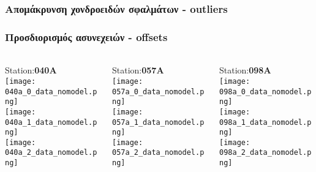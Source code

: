 \begin{frame}
  \frametitle{Απομάκρυνση χονδροειδών σφαλμάτων - outliers}
  \framesubtitle{}
  \label{}
  
\end{frame}
\note{}

\begin{frame}
  \frametitle{Προσδιορισμός ασυνεχειών - offsets}
  \framesubtitle{}
  \label{}
  \vskip-1cm
  \begin{columns}[T]
    \begin{column}{.33\textwidth}
      \begin{center}
      Station:\textbf{040A}\\
         \texttt{[image: 040a\_0\_data\_nomodel.png]}\\
         \texttt{[image: 040a\_1\_data\_nomodel.png]}\\
         \texttt{[image: 040a\_2\_data\_nomodel.png]}
       \end{center} 
    \end{column}
    \begin{column}{.33\textwidth}
      \begin{center}
      Station:\textbf{057A}\\
         \texttt{[image: 057a\_0\_data\_nomodel.png]}\\
         \texttt{[image: 057a\_1\_data\_nomodel.png]}\\
         \texttt{[image: 057a\_2\_data\_nomodel.png]}
       \end{center} 
    \end{column}
    \begin{column}{.33\textwidth}
      \begin{center}
      Station:\textbf{098A}\\
         \texttt{[image: 098a\_0\_data\_nomodel.png]}\\
         \texttt{[image: 098a\_1\_data\_nomodel.png]}\\
         \texttt{[image: 098a\_2\_data\_nomodel.png]}
       \end{center} 
      
    \end{column}
  \end{columns}
\end{frame}
\note{}

